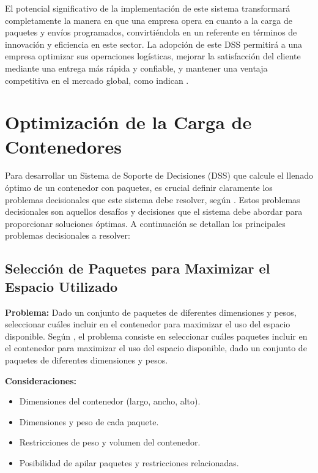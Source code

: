 \documentclass[9pt,a4paper]{rho}
\begin{document}
El potencial significativo de la implementación de este sistema transformará completamente la manera en que una empresa opera en cuanto a la carga de paquetes y envíos programados, convirtiéndola en un referente en términos de innovación y eficiencia en este sector. La adopción de este DSS permitirá a una empresa optimizar sus operaciones logísticas, mejorar la satisfacción del cliente mediante una entrega más rápida y confiable, y mantener una ventaja competitiva en el mercado global, como indican \parencite{slack2010operations}.

\section{Optimización de la Carga de Contenedores}

Para desarrollar un Sistema de Soporte de Decisiones (DSS) que calcule el llenado óptimo de un contenedor con paquetes, es crucial definir claramente los problemas decisionales que este sistema debe resolver, según \textcite{murty2005decision}. Estos problemas decisionales son aquellos desafíos y decisiones que el sistema debe abordar para proporcionar soluciones óptimas. A continuación se detallan los principales problemas decisionales a resolver:

\subsection{Selección de Paquetes para Maximizar el Espacio Utilizado}

\textbf{Problema:} Dado un conjunto de paquetes de diferentes dimensiones y pesos, seleccionar cuáles incluir en el contenedor para maximizar el uso del espacio disponible. Según \textcite{gilmore1965multistage}, el problema consiste en seleccionar cuáles paquetes incluir en el contenedor para maximizar el uso del espacio disponible, dado un conjunto de paquetes de diferentes dimensiones y pesos.

\textbf{Consideraciones:}
\begin{itemize}
    \item Dimensiones del contenedor (largo, ancho, alto).
    \item Dimensiones y peso de cada paquete.
    \item Restricciones de peso y volumen del contenedor.
    \item Posibilidad de apilar paquetes y restricciones relacionadas.
\end{itemize}
\end{document}
